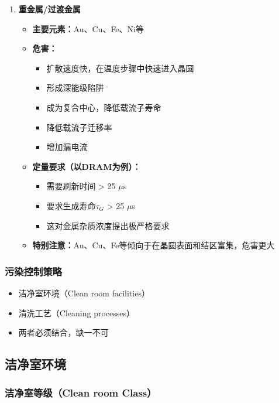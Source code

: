 \documentclass[UTF8,12pt,a4paper]{ctexart}
\begin{document}
\begin{enumerate}
    \item \textbf{重金属/过渡金属}
    \begin{itemize}
        \item \textbf{主要元素：}Au、Cu、Fe、Ni等
        \item \textbf{危害：}
        \begin{itemize}
            \item 扩散速度快，在温度步骤中快速进入晶圆
            \item 形成深能级陷阱
            \item 成为复合中心，降低载流子寿命
            \item 降低载流子迁移率
            \item 增加漏电流
        \end{itemize}
        \item \textbf{定量要求（以DRAM为例）：}
        \begin{itemize}
            \item 需要刷新时间 > 25 $\mu$s
            \item 要求生成寿命$\tau_G$ > 25 $\mu$s
            \item 这对金属杂质浓度提出极严格要求
        \end{itemize}
        \item \textbf{特别注意：}Au、Cu、Fe等倾向于在晶圆表面和结区富集，危害更大
    \end{itemize}
\end{enumerate}

\subsubsection{污染控制策略}

\begin{itemize}
    \item 洁净室环境（Clean room facilities）
    \item 清洗工艺（Cleaning processes）
    \item 两者必须结合，缺一不可
\end{itemize}

\subsection{洁净室环境}

\subsubsection{洁净室等级（Clean room Class）}
\end{document}
